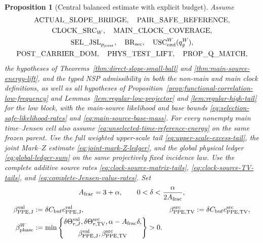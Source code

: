 \documentclass[11pt]{article}
\newtheorem{proposition}[theorem]{Proposition}
\begin{document}
\begin{proposition}[Central balanced estimate with explicit budget]
\label{prop:central-phase-verification}
Assume
\[
 \begin{gathered}
 \mathrm{ACTUAL\_SLOPE\_BRIDGE},\quad
 \mathrm{PAIR\_SAFE\_REFERENCE},\\
 \mathrm{CLOCK\_SRC}_{W},\quad
 \mathrm{MAIN\_CLOCK\_COVERAGE},\\
 \mathrm{SEL\_JSL}_{p_{\rm joint}},\quad
 \mathrm{BR}_{\rm sec},\quad
 \mathrm{USC}_{\rm end}^{W}(q_g^W),\\
 \mathrm{POST\_CARRIER\_DOM},\quad
 \mathrm{PHYS\_TEST\_LIFT},\quad
 \mathrm{PROP\_Q\_MATCH},
 \end{gathered}
\]
the hypotheses of Theorems~\ref{thm:direct-slope-small-ball} and
\ref{thm:main-source-energy-lift}, and the typed NSP admissibility in both
the non-main and main clock definitions,
as well as all hypotheses of
Proposition~\ref{prop:functional-correlation-low-frequency} and
Lemmas~\ref{lem:regular-low-projector} and
\ref{lem:regular-high-tail} for the low block,
with the main-source likelihood and base bounds
\eqref{eq:selection-safe-likelihood-rates} and
\eqref{eq:main-source-base-mass}.  For every nonempty main time--Jensen cell
also assume \eqref{eq:unselected-time-reference-energy} on the same frozen
parent.  Use
the full weighted upper-scale tail \eqref{eq:upper-scale-excess-tail}, the
joint Mark--$Z$ estimate \eqref{eq:joint-mark-Z-ledger}, and the global
physical ledger \eqref{eq:global-ledger-sum} on the same projectively fixed
incidence law.  Use
the complete additive source rates
\eqref{eq:clock-source-matrix-tails},
\eqref{eq:clock-source-TV-tails}, and
\eqref{eq:complete-Jensen-value-rates}.  Set
\[
 A_{\rm frac}=3+\alpha,\qquad
 0<\delta<\frac{\alpha}{2A_{\rm frac}},
\]
\begin{equation}
\label{eq:complete-phase-exponent}
\begin{aligned}
 \beta_{\rm PPE,J}^{\rm val}&:=
   \delta C_{\rm buf}c_{\rm PPE,J}^{\rm val},
 &\beta_{\rm PPE,TV}^{\rm src}&:=
   \delta C_{\rm buf}c_{\rm PPE,TV}^{\rm src},\\
 \beta_{\rm phase}^{W}&:=
 \min\left\{
 \begin{gathered}
  \delta\Theta_{r,J}^{\rm val},
  \delta\Theta_{r,\rm TV}^{\rm src},
  \alpha-A_{\rm frac}\delta,\\
  \beta_{\rm PPE,J}^{\rm val},
  \beta_{\rm PPE,TV}^{\rm src}
 \end{gathered}
 \right\}>0.
\end{aligned}

\end{equation}
\end{proposition}
\end{document}
